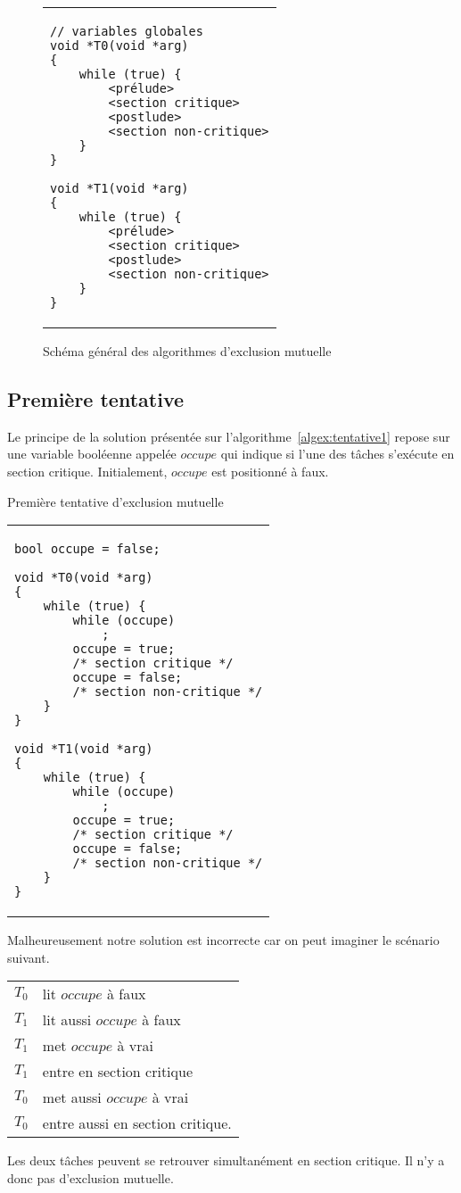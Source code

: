 \begin{figure}[!ht]

\begin{center}
\begin{tabular}{l}
\lstset{language=C++}
\begin{lstlisting}
// variables globales
void *T0(void *arg)
{
	while (true) {
		<prélude>
		<section critique>
		<postlude>
		<section non-critique>
	}
}

void *T1(void *arg)
{
	while (true) {
		<prélude>
		<section critique>
		<postlude>
		<section non-critique>
	}
}
\end{lstlisting}
\end{tabular}
\caption{\label{algex:générale}Schéma général des algorithmes d'exclusion mutuelle}
\end{center}
\end{figure}

\subsection*{Première tentative}
Le principe de la solution présentée sur l'algorithme~\ref{algex:tentative1} repose sur une variable booléenne appelée $occupe$ qui indique si l'une des tâches s'exécute en section critique.
Initialement, $occupe$ est positionné à faux.

\begin{algorithm}[!ht]
\caption{Première tentative d'exclusion mutuelle}\label{algex:tentative1}
\begin{center}
\begin{tabular}{l}
\lstset{language=C++}
\begin{lstlisting}
bool occupe = false;

void *T0(void *arg)
{
	while (true) {
		while (occupe)
			;
		occupe = true;
		/* section critique */
		occupe = false;
		/* section non-critique */
	}
}

void *T1(void *arg)
{
	while (true) {
		while (occupe)
			;
		occupe = true;
		/* section critique */
		occupe = false;
		/* section non-critique */
	}
}
\end{lstlisting}
\end{tabular}
\end{center}
\end{algorithm}

Malheureusement notre solution est incorrecte car on peut imaginer le scénario suivant.
\begin{center}
\begin{tabular}{cl}
$T_0$& lit $occupe$ à faux \\
$T_1$& lit aussi $occupe$ à faux \\
$T_1$& met $occupe$ à vrai \\
$T_1$& entre en section critique \\
$T_0$& met aussi $occupe$ à vrai \\
$T_0$& entre aussi en section critique. \\
\end{tabular}
\end{center}
Les deux tâches peuvent se retrouver simultanément en section critique.  Il n'y a donc pas d'exclusion mutuelle.

